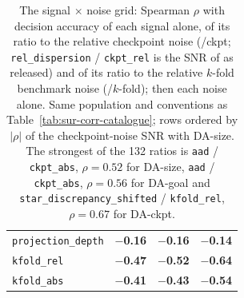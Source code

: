 \begin{table}[h]
\begin{tabular}{@{}lrrrrrrrrr@{}}
\texttt{projection\_depth} & \multicolumn{3}{c}{\textbf{$-$0.16}} & \multicolumn{3}{c}{\textbf{$-$0.16}} & \multicolumn{3}{c}{\textbf{$-$0.14}} \\
\texttt{kfold\_rel} & \multicolumn{3}{c}{\textbf{$-$0.47}} & \multicolumn{3}{c}{\textbf{$-$0.52}} & \multicolumn{3}{c}{\textbf{$-$0.64}} \\
\texttt{kfold\_abs} & \multicolumn{3}{c}{\textbf{$-$0.41}} & \multicolumn{3}{c}{\textbf{$-$0.43}} & \multicolumn{3}{c}{\textbf{$-$0.54}} \\
\bottomrule
\end{tabular}
\caption{The signal $\times$ noise grid: Spearman $\rho$ with decision accuracy of each signal alone, of its ratio to the relative checkpoint noise (/ckpt; \texttt{rel\_dispersion} / \texttt{ckpt\_rel} is the SNR of \citet{heineman_signal_2025} as released) and of its ratio to the relative $k$-fold benchmark noise (/$k$-fold); then each noise alone. Same population and conventions as Table~\ref{tab:sur-corr-catalogue}; rows ordered by $|\rho|$ of the checkpoint-noise SNR with DA-size. The strongest of the 132 ratios is \texttt{aad} / \texttt{ckpt\_abs}, $\rho = 0.52$ for DA-size, \texttt{aad} / \texttt{ckpt\_abs}, $\rho = 0.56$ for DA-goal and \texttt{star\_discrepancy\_shifted} / \texttt{kfold\_rel}, $\rho = 0.67$ for DA-ckpt.}
\label{tab:sur-corr-snr}
\end{table}
